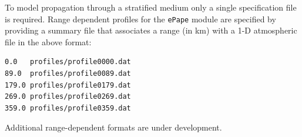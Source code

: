 To model propagation through a stratified medium only a single specification file is required. Range dependent profiles for the \verb"ePape" module are specified by providing a summary file that associates a range (in km) with a 1-D atmospheric file in the above format:
\begin{verbatim}
0.0   profiles/profile0000.dat
89.0  profiles/profile0089.dat
179.0 profiles/profile0179.dat
269.0 profiles/profile0269.dat
359.0 profiles/profile0359.dat
\end{verbatim}
Additional range-dependent formats are under development.